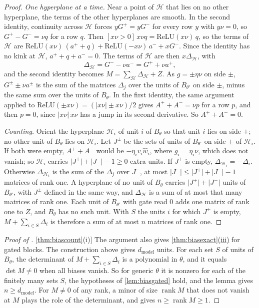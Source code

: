 \documentclass[10pt]{article}
\theoremstyle{definition}
\theoremstyle{remark}
\newcommand{\dm}{d_{\mathrm{model}}}
\DeclareRobustCommand{\cpref}[2]{\hyperref[#1:#2]{\cref*{#1}(#2)}}
\begin{document}
\begin{proof}
\emph{One hyperplane at a time.} Near a point of $\mathcal H$ that lies on no other hyperplane, the terms of the other hyperplanes are smooth. In the second identity, continuity across $\mathcal H$ forces $yG^+ = yG^-$ for every row $y$ with $y\nu = 0$, so $G^+ - G^- = \nu q$ for a row $q$. Then $[x\nu > 0]\,x\nu q = \mathrm{ReLU}(x\nu)\,q$, so the terms of $\mathcal H$ are $\mathrm{ReLU}(x\nu)\,(a^+ + q) + \mathrm{ReLU}(-x\nu)\,a^- + xG^-$. Since the identity has no kink at $\mathcal H$, $a^+ + q + a^- = 0$. The terms of $\mathcal H$ are then $x\Delta_{\mathcal H}$, with
\[
\Delta_{\mathcal H} = G^- - \nu a^- = G^+ + \nu a^+,
\]
and the second identity becomes $M = \sum_{\mathcal H}\Delta_{\mathcal H} + Z$. As $g = \pm\eta\nu$ on side $\pm$, $G^\pm \pm \nu a^\pm$ is the sum of the matrices $\Delta_j$ over the units of $B_{\theta'}$ on side $\pm$, minus the same sum over the units of $B_\theta$. In the first identity, the same argument applied to $\mathrm{ReLU}(\pm x\nu) = (\lvert x\nu\rvert \pm x\nu)/2$ gives $A^+ + A^- = \nu p$ for a row $p$, and then $p = 0$, since $\lvert x\nu\rvert\,x\nu$ has a jump in its second derivative. So $A^+ + A^- = 0$.

\emph{Counting.} Orient the hyperplane $\mathcal H_i$ of unit $i$ of $B_\theta$ so that unit $i$ lies on side $+$; no other unit of $B_\theta$ lies on $\mathcal H_i$. Let $J^\pm$ be the sets of units of $B_{\theta'}$ on side $\pm$ of $\mathcal H_i$. If both were empty, $A^+ + A^-$ would be $-\eta_iv_i\hat w_i$, where $g_i = \eta_i\nu$, which does not vanish; so $\mathcal H_i$ carries $\lvert J^+\rvert + \lvert J^-\rvert - 1 \ge 0$ extra units. If $J^+$ is empty, $\Delta_{\mathcal H_i} = -\Delta_i$. Otherwise $\Delta_{\mathcal H_i}$ is the sum of the $\Delta_j$ over $J^-$, at most $\lvert J^-\rvert \le \lvert J^+\rvert + \lvert J^-\rvert - 1$ matrices of rank one. A hyperplane of no unit of $B_\theta$ carries $\lvert J^+\rvert + \lvert J^-\rvert$ units of $B_{\theta'}$, with $J^\pm$ defined in the same way, and $\Delta_{\mathcal H}$ is a sum of at most that many matrices of rank one. Each unit of $B_{\theta'}$ with gate read $0$ adds one matrix of rank one to $Z$, and $B_\theta$ has no such unit. With $S$ the units $i$ for which $J^+$ is empty, $M + \sum_{i\in S}\Delta_i$ is therefore a sum of at most $n$ matrices of rank one.
\end{proof}

\begin{proof}[Proof of \cpref{thm:biascount}{i}]
The argument also gives \cpref{thm:biasexact}{iii} for gated blocks. The construction above gives $\dm$ units. For each set $S$ of units of $B_\theta$, the determinant of $M + \sum_{i\in S}\Delta_i$ is a polynomial in $\theta$, and it equals $\det M \neq 0$ when all biases vanish. So for generic $\theta$ it is nonzero for each of the finitely many sets $S$, the hypotheses of \cref{lem:biasgated} hold, and the lemma gives $n \ge \dm$. For $M \neq 0$ of any rank, a minor of size $\operatorname{rank}M$ that does not vanish at $M$ plays the role of the determinant, and gives $n \ge \operatorname{rank}M \ge 1$.
\end{proof}
\end{document}

